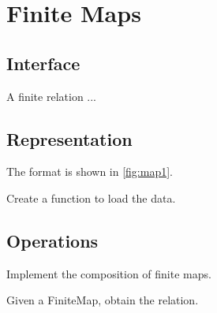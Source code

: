 \section{Finite Maps}

\subsection*{Interface}

A finite relation  ...


\subsection*{Representation}

The format is shown in \cref{fig:map1}.


\begin{gradedexercise}[Representation]
  Create a function to load the data.


%

\end{gradedexercise}

\subsection{Operations}


\begin{gradedexercise}[Composition]
  Implement the composition of finite maps.


%

\end{gradedexercise}


\begin{gradedexercise}
  Given a FiniteMap, obtain the relation.


%

\end{gradedexercise}
